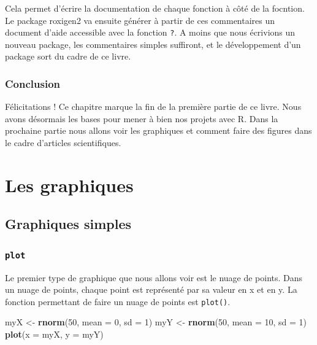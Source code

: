 \documentclass[]{book}
\newenvironment{Shaded}{\begin{snugshade}}{\end{snugshade}}
\newcommand{\DataTypeTok}[1]{\textcolor[rgb]{0.13,0.29,0.53}{#1}}
\newcommand{\DecValTok}[1]{\textcolor[rgb]{0.00,0.00,0.81}{#1}}
\newcommand{\KeywordTok}[1]{\textcolor[rgb]{0.13,0.29,0.53}{\textbf{#1}}}
\newcommand{\NormalTok}[1]{#1}
\newcommand{\StringTok}[1]{\textcolor[rgb]{0.31,0.60,0.02}{#1}}
\begin{document}
Cela permet d'écrire la documentation de chaque fonction à côté de la focntion. Le package roxigen2 va ensuite générer à partir de ces commentaires un document d'aide accessible avec la fonction \texttt{\textquotesingle{}?\textquotesingle{}}. A moins que nous écrivions un nouveau package, les commentaires simples suffiront, et le développement d'un package sort du cadre de ce livre.

\hypertarget{conclusion-7}{%
\section{Conclusion}\label{conclusion-7}}

Félicitations ! Ce chapitre marque la fin de la première partie de ce livre. Nous avons désormais les bases pour mener à bien nos projets avec R. Dans la prochaine partie nous allons voir les graphiques et comment faire des figures dans le cadre d'articles scientifiques.

\hypertarget{part-les-graphiques}{%
\part{Les graphiques}\label{part-les-graphiques}}

\hypertarget{graph1}{%
\chapter{Graphiques simples}\label{graph1}}

\hypertarget{graph1plot}{%
\section{\texorpdfstring{\texttt{plot}}{plot}}\label{graph1plot}}

Le premier type de graphique que nous allons voir est le nuage de points. Dans un nuage de points, chaque point est représenté par sa valeur en x et en y. La fonction permettant de faire un nuage de points est \texttt{plot()}.

\begin{Shaded}
\begin{Highlighting}[]
\NormalTok{myX <-}\StringTok{ }\KeywordTok{rnorm}\NormalTok{(}\DecValTok{50}\NormalTok{, }\DataTypeTok{mean =} \DecValTok{0}\NormalTok{, }\DataTypeTok{sd =} \DecValTok{1}\NormalTok{)}
\NormalTok{myY <-}\StringTok{ }\KeywordTok{rnorm}\NormalTok{(}\DecValTok{50}\NormalTok{, }\DataTypeTok{mean =} \DecValTok{10}\NormalTok{, }\DataTypeTok{sd =} \DecValTok{1}\NormalTok{)}
\KeywordTok{plot}\NormalTok{(}\DataTypeTok{x =}\NormalTok{ myX, }\DataTypeTok{y =}\NormalTok{ myY)}
\end{Highlighting}
\end{Shaded}
\end{document}
